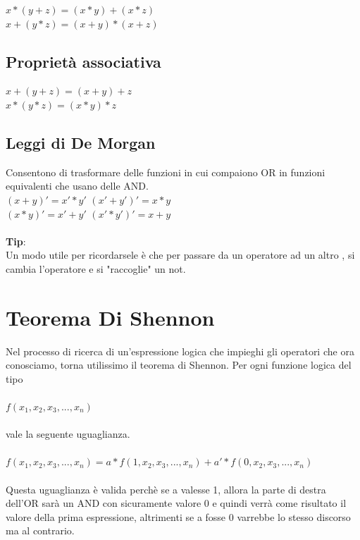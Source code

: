 \documentclass[a4paper]{book}
\begin{document}
\( x*(y+z)=(x*y)+(x*z)  \) \\
\( x+(y*z)=(x+y)*(x+z)  \)

\subsection*{Proprietà associativa}

\(x+(y+z)=(x+y)+z \) \\
\(x*(y*z)=(x*y)*z \) 

\subsection*{Leggi di De Morgan}

Consentono di trasformare delle funzioni in cui compaiono OR in funzioni equivalenti che usano delle AND.\\
\( (x+y)' = x' * y' \) \hspace{3cm} \( (x'+y')' = x*y\) \\
\( (x*y)' = x' + y' \) \hspace{3cm} \( (x'*y')'= x+y\)
\\
\\
\textbf{Tip}:\\ Un modo utile per ricordarsele è che per passare da un operatore ad un altro , si cambia l'operatore e si "raccoglie" un not.

\newpage
\section{Teorema Di Shennon}
Nel processo di ricerca di un'espressione logica che impieghi gli operatori che ora conosciamo, torna utilissimo il teorema di Shennon.
Per ogni funzione logica del tipo\\\\ \( f({x_1},{x_2},{x_3},...,{x_n}) \)\\\\vale la seguente uguaglianza.\\\\ \(f({x_1},{x_2},{x_3},...,{x_n})=a*f(1,{x_2},{x_3},...,{x_n})+a'*f(0,{x_2},{x_3},...,{x_n})\)\\\\
Questa uguaglianza è valida perchè se a valesse 1, allora la parte di destra dell'OR sarà un AND con sicuramente valore 0 e quindi verrà come risultato il valore della prima espressione, altrimenti se a fosse 0 varrebbe lo stesso discorso ma al contrario.
\end{document}
